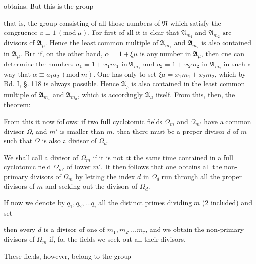 obtains. But this is the group

that is, the group consisting of all those numbers of $\mathfrak{N}$ which satisfy
the congruence $a \equiv 1\,(\mathrm{mod}\ \mu)$. For first of all it is clear
that $\mathfrak{A}_{m_1}$ and $\mathfrak{A}_{m_2}$ are divisors of $\mathfrak{A}_\mu$. Hence the
least common multiple of $\mathfrak{A}_{m_1}$ and $\mathfrak{A}_{m_2}$ is also contained in $\mathfrak{A}_\mu$.
But if, on the other hand, $\alpha = 1 + \xi\mu$ is any number in $\mathfrak{A}_\mu$, then
one can determine the numbers $a_1 = 1 + x_1 m_1$ in $\mathfrak{A}_{m_1}$ and $a_2 = 1 + x_2 m_2$
in $\mathfrak{A}_{m_2}$ in such a way that $\alpha \equiv a_1 a_2\,(\mathrm{mod}\ m)$. One has
only to set $\xi\mu = x_1 m_1 + x_2 m_2$, which by Bd. I, §. 118 is always
possible. Hence $\mathfrak{A}_\mu$ is also contained in the least common multiple of $\mathfrak{A}_{m_1}$ and $\mathfrak{A}_{m_2}$, which is accordingly
$\mathfrak{A}_\mu$ itself. From this, then, the theorem:


From this it now follows: if two full cyclotomic fields $\Omega_m$
and $\Omega_{m'}$ have a common divisor $\Omega$, and $m'$ is smaller
than $m$, then there must be a proper divisor $d$ of $m$ such that
$\Omega$ is also a divisor of $\Omega_d$.

We shall call a divisor of $\Omega_m$  if it is
not at the same time contained in a full cyclotomic field $\Omega_{m'}$ of
lower $m'$. It then follows that one obtains all
the non-primary divisors of $\Omega_m$ by letting the
index $d$ in $\Omega_d$ run through all the proper divisors of $m$ and
seeking out the divisors of $\Omega_d$.

If now we denote by $q_1, q_2, \ldots q_\tau$ all the distinct
primes dividing $m$ (2 included) and
set

then every $d$ is a divisor of one of $m_1, m_2, \ldots m_\tau$, and we obtain the non-primary divisors of $\Omega_m$ if, for the fields
we seek out all their divisors.

These fields, however, belong to the group
